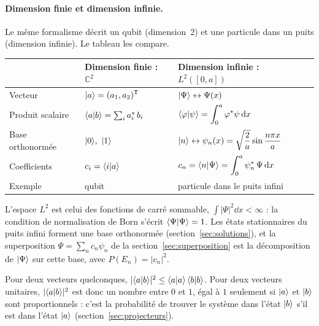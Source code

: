 \paragraph{Dimension finie et dimension infinie.} Le même formalisme décrit un qubit
(dimension~2) et une particule dans un puits (dimension infinie). Le tableau les compare.

\begin{center}
\renewcommand{\arraystretch}{1.55}
\begin{tabular}{@{}lll@{}}
\toprule
 & \textbf{Dimension finie : $\mathbb{C}^2$} & \textbf{Dimension infinie : $L^2([0,a])$} \\
\midrule
Vecteur & $|a\rangle=(a_1,a_2)^{\mathsf{T}}$ & $|\Psi\rangle\leftrightarrow\Psi(x)$ \\
Produit scalaire & $\langle a|b\rangle=\sum_i a_i^*\,b_i$
  & $\langle \varphi|\psi\rangle=\displaystyle\int_0^a\varphi^*\psi\,\mathrm{d} x$ \\
Base orthonormée & $\ket{0},\ \ket{1}$ & $|n\rangle\leftrightarrow\psi_n(x)=\sqrt{\dfrac2a}\sin\dfrac{n\pi x}{a}$ \\
Coefficients & $c_i=\langle i|a\rangle$ & $c_n=\langle n|\Psi\rangle=\displaystyle\int_0^a\psi_n^*\,\Psi\,\mathrm{d} x$ \\
Exemple & qubit & particule dans le puits infini \\
\bottomrule
\end{tabular}
\end{center}

L'espace $L^2$ est celui des fonctions de carré sommable, $\int|\Psi|^2\dd x<\infty$ : la
condition de normalisation de Born s'écrit $\langle \Psi|\Psi\rangle=1$. Les états stationnaires du
puits infini forment une base orthonormée (section~\ref{sec:solutions}), et la superposition
$\Psi=\sum_n c_n\psi_n$ de la section~\ref{sec:superposition} est la décomposition de $|\Psi\rangle$
sur cette base, avec $P(E_n)=|c_n|^2$.

\begin{remarque}
Pour deux vecteurs quelconques, $|\langle a|b\rangle|^2\leq\langle a|a\rangle\,\langle b|b\rangle$. Pour deux
vecteurs unitaires, $|\langle a|b\rangle|^2$ est donc un nombre entre $0$ et $1$, égal à $1$ seulement si
$|a\rangle$ et $|b\rangle$ sont proportionnels : c'est la probabilité de trouver le système dans
l'état $|b\rangle$ s'il est dans l'état $|a\rangle$ (section~\ref{sec:projecteurs}).
\end{remarque}

